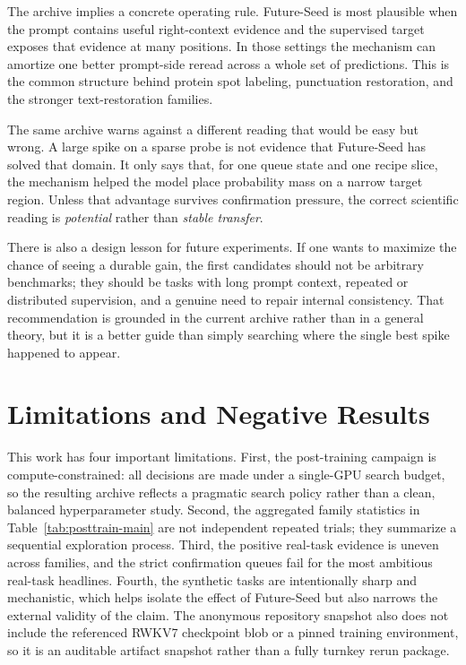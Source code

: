 \documentclass{article}
\begin{document}
The archive implies a concrete operating rule. Future-Seed is most plausible when the prompt contains useful right-context evidence and the supervised target exposes that evidence at many positions. In those settings the mechanism can amortize one better prompt-side reread across a whole set of predictions. This is the common structure behind protein spot labeling, punctuation restoration, and the stronger text-restoration families.

The same archive warns against a different reading that would be easy but wrong. A large spike on a sparse probe is not evidence that Future-Seed has solved that domain. It only says that, for one queue state and one recipe slice, the mechanism helped the model place probability mass on a narrow target region. Unless that advantage survives confirmation pressure, the correct scientific reading is \emph{potential} rather than \emph{stable transfer}.

There is also a design lesson for future experiments. If one wants to maximize the chance of seeing a durable gain, the first candidates should not be arbitrary benchmarks; they should be tasks with long prompt context, repeated or distributed supervision, and a genuine need to repair internal consistency. That recommendation is grounded in the current archive rather than in a general theory, but it is a better guide than simply searching where the single best spike happened to appear.

\section{Limitations and Negative Results}
This work has four important limitations. First, the post-training campaign is compute-constrained: all decisions are made under a single-GPU search budget, so the resulting archive reflects a pragmatic search policy rather than a clean, balanced hyperparameter study. Second, the aggregated family statistics in Table~\ref{tab:posttrain-main} are not independent repeated trials; they summarize a sequential exploration process. Third, the positive real-task evidence is uneven across families, and the strict confirmation queues fail for the most ambitious real-task headlines. Fourth, the synthetic tasks are intentionally sharp and mechanistic, which helps isolate the effect of Future-Seed but also narrows the external validity of the claim. The anonymous repository snapshot also does not include the referenced RWKV7 checkpoint blob or a pinned training environment, so it is an auditable artifact snapshot rather than a fully turnkey rerun package.
\end{document}
